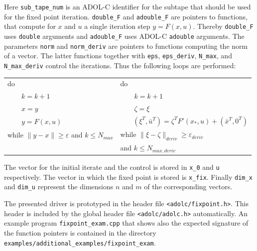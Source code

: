 \documentclass[11pt,twoside]{article}
\begin{document}
%
Here {\tt sub\_tape\_num} is an ADOL-C identifier for the subtape that
should be used for the fixed point iteration.
{\tt double\_F} and {\tt adouble\_F} are pointers to functions, that
compute for $x$ and $u$ a single iteration step $y=F(x,u)$. Thereby
{\tt double\_F} uses {\tt double} arguments and {\tt adouble\_F}
uses ADOL-C {\tt adouble} arguments. The parameters {\tt norm} and
{\tt norm\_deriv} are pointers to functions computing the norm
of a vector. The latter functions together with {\tt eps},
{\tt eps\_deriv}, {\tt N\_max}, and {\tt N\_max\_deriv} control
the iterations. Thus the following loops are performed:
\begin{center}
\begin{tabular}{ll}
  do                     &   do                           \\
  ~~~~$k = k+1$          &   ~~~~$k = k+1$                \\
  ~~~~$x = y$            &   ~~~~$\zeta = \xi$            \\
  ~~~~$y = F(x,u)$       &   ~~~
  $(\xi^T,\bar u^T) = \zeta^TF'(x_*,u) + (\bar x^T, 0^T)$ \\
  while $\|y-x\|\geq\varepsilon$ and $k\leq N_{max}$ \hspace*{0.5cm} &
  while $\|\xi -\zeta\|_{deriv}\geq\varepsilon_{deriv}$   \\
  & and $k\leq N_{max,deriv}$
\end{tabular}
\end{center}
The vector for the initial iterate and the control is stored
in {\tt x\_0} and {\tt u} respectively. The vector in which the
fixed point is stored is {\tt x\_fix}. Finally {\tt dim\_x}
and {\tt dim\_u} represent the dimensions $n$ and $m$ of the
corresponding vectors.

The presented driver is prototyped in the header file 
\verb=<adolc/fixpoint.h>=. This header
is included by the global header file \verb=<adolc/adolc.h>= automatically. 
An example program \verb=fixpoint_exam.cpp= that shows also the
expected signature of the function pointers is contained in the directory \verb=examples/additional_examples/fixpoint_exam=.
%
\end{document}
